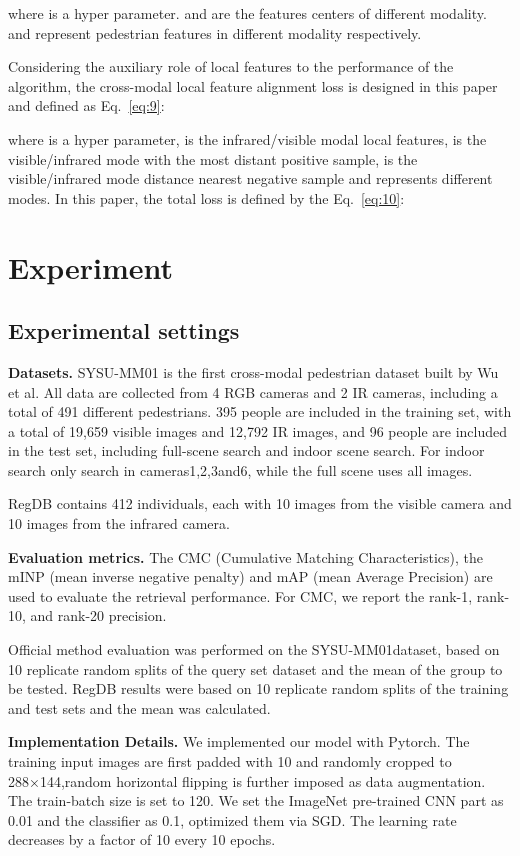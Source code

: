 \documentclass[journal]{IEEEtran}
\begin{document}
where  is a hyper parameter. and  are the features centers of different modality.  and  represent pedestrian features in different modality respectively.

Considering the auxiliary role of local features to the performance of the algorithm, the cross-modal local feature alignment loss  is designed in this paper and defined as Eq.~\ref{eq:9}:

where  is a hyper parameter,  is the infrared/visible modal local features,  is the visible/infrared mode with the most distant positive sample, is the visible/infrared mode  distance nearest negative sample and  represents different modes.
In this paper, the total loss  is defined by the Eq.~\ref{eq:10}:


\section{Experiment}
\label{section4}
\subsection{Experimental settings}
\textbf{Datasets.} 
SYSU-MM01 is the first cross-modal pedestrian dataset built by Wu et al. All data are collected from 4 RGB cameras and 2 IR cameras, including a total of 491 different pedestrians. 395 people are included in the training set, with a total of 19,659 visible images and 12,792 IR images, and 96 people are included in the test set, including full-scene search and indoor scene search. For indoor search only search in cameras1,2,3and6, while the full scene uses all images.

RegDB\textsuperscript{\cite{nguyen2017person}} contains 412 individuals, each with 10 images from the visible camera and 10 images from the infrared camera.

\textbf{Evaluation metrics.} 
The CMC (Cumulative Matching Characteristics), the mINP (mean inverse negative penalty) and mAP (mean Average Precision) are used to evaluate the retrieval performance. For CMC, we report the rank-1, rank-10, and rank-20 precision.

Official method evaluation was performed on the SYSU-MM01dataset, based on 10 replicate random splits of the query set dataset and the mean of the group to be tested. RegDB results were based on 10 replicate random splits of the training and test sets and the mean was calculated.

\textbf{Implementation Details.} 
We implemented our model with Pytorch. The training input images are first padded with 10 and randomly cropped to 288×144,random horizontal flipping is further imposed as data augmentation. The train-batch size is set to 120.  We set the ImageNet pre-trained CNN part as 0.01 and the classifier as 0.1, optimized them via SGD. The learning rate decreases by a factor of 10 every 10 epochs.
\end{document}
